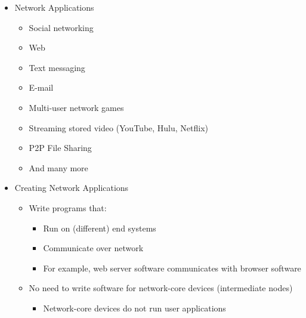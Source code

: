 \begin{itemize}

  \item Network Applications

    \begin{itemize}

      \item Social networking

      \item Web

      \item Text messaging

      \item E-mail

      \item Multi-user network games

      \item Streaming stored video (YouTube, Hulu, Netflix)

      \item P2P File Sharing

      \item And many more

    \end{itemize}

  \item Creating Network Applications

    \begin{itemize}

      \item Write programs that:

        \begin{itemize}

          \item Run on (different) end systems

          \item Communicate over network

          \item For example, web server software communicates with browser software

        \end{itemize}

      \item No need to write software for network-core devices (intermediate nodes)

        \begin{itemize}

          \item Network-core devices do not run user applications


\end{itemize}
\end{itemize}
\end{itemize}
